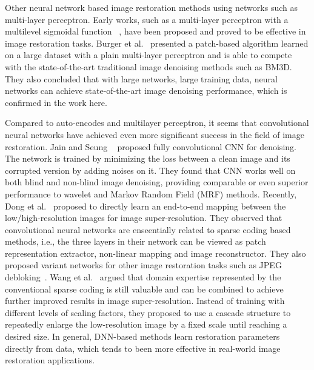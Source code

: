 Other neural network based image restoration methods using networks such as multi-layer perceptron.
Early works, such as a multi-layer perceptron with a multilevel sigmoidal function
~\cite{DBLP:journals/tsp/SivakumarD93}, have been proposed and proved to be effective in image
restoration tasks. Burger et al.~\cite{DBLP:conf/cvpr/BurgerSH12} presented a patch-based algorithm
learned on a large dataset with a plain multi-layer perceptron and is able to compete with the
state-of-the-art traditional image denoising methods such as BM3D. They also concluded that with large networks,
large training data, neural networks can achieve state-of-the-art image denoising performance,
which is confirmed in the work here.

Compared to auto-encodes and multilayer perceptron, it seems that convolutional neural networks
have achieved even more significant success in the field of image restoration. Jain and Seung
~\cite{DBLP:conf/nips/JainS08} proposed fully convolutional CNN for denoising. The network is
trained by minimizing the loss between a clean image and its corrupted version by adding noises
on it. They found that CNN works well on both blind and non-blind image denoising, providing
comparable or even superior performance to wavelet and Markov Random Field (MRF) methods.
Recently, Dong et al.~\cite{DBLP:journals/pami/DongLHT16} proposed to directly learn an end-to-end
mapping between the low/high-resolution images for image super-resolution. They observed that
convolutional neural networks are enseentially related to sparse coding based methods, i.e.,
the three layers in their network can be viewed as patch representation extractor, non-linear mapping
and image reconstructor. They also proposed variant networks for other image restoration
tasks such as JPEG debloking~\cite{DBLP:conf/iccv/DongDLT15}. Wang et al.~\cite{DBLP:conf/iccv/WangLYHH15}
argued that domain expertise represented by the conventional sparse coding is still valuable
and can be combined to achieve further improved results in image super-resolution. Instead of
training with different levels of scaling factors, they proposed to use a cascade structure to
repeatedly enlarge the low-resolution image by a fixed scale until reaching a desired size.
In general, DNN-based methods learn restoration parameters directly from data, which tends to
been more effective in real-world image restoration applications.
